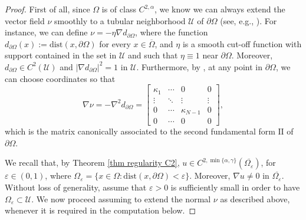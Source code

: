 \documentclass[10pt,a4paper]{amsart}
\numberwithin{equation}{section}
\begin{document}
\begin{proof}
    First of all, since $\Omega$ is of class $C^{2,\alpha}$, we know we can always extend the vector field $\nu$ smoothly to a tubular neighborhood $\mathcal{U}$ of $\partial\Omega$ (see, e.g., \cite{krpa81}). For instance, we can define $\nu = -\eta \nabla d_{\partial\Omega}$, where the function $d_{\partial\Omega}(x) := \mathrm{dist}(x,\partial\Omega)$ for every $x \in \overline{\Omega}$, and $\eta$ is a smooth cut-off function with support contained in the set in $\mathcal{U}$ and such that $\eta \equiv 1$ near $\partial\Omega$. Moreover, $d_{\partial\Omega} \in C^2(\mathcal{U})$ and $|\nabla d_{\partial\Omega}|^2 = 1$ in $\mathcal{U}$. Furthermore, by \cite[Appendix 14.6]{gitr83}, at any point in $\partial\Omega$, we can choose coordinates so that
    \begin{equation*}
        \nabla \nu = - \nabla^2 d_{\partial\Omega} = 
        \left[\begin{matrix}
        \kappa_1  &\cdots &0 &0 \\
        \vdots &\ddots &\vdots  &\vdots \\
        0  &\cdots &\kappa_{N-1} &0 \\
        0  &\cdots &0 &0
        \end{matrix}
        \right],
    \end{equation*}
    which is the matrix canonically associated to the second fundamental form $\mathrm{I\!I}$ of $\partial\Omega$.

    We recall that, by Theorem \ref{thm regularity C2}, $u \in C^{2,\min\{\alpha,\gamma\}}(\overline{\Omega_\varepsilon})$, for $\varepsilon \in (0,1)$, where $\Omega_\varepsilon=\{x\in\Omega: \mathrm{dist}(x,\partial\Omega)<\varepsilon\}$. Moreover, $\nabla u \neq 0$ in $\overline{\Omega_\varepsilon}$. Without loss of generality, assume that $\varepsilon > 0 $ is sufficiently small in order to have $\Omega_\varepsilon \subset \mathcal{U}$.
    We now proceed assuming to extend the normal $\nu$ as described above, whenever it is required in the computation below.


\end{proof}
\end{document}
